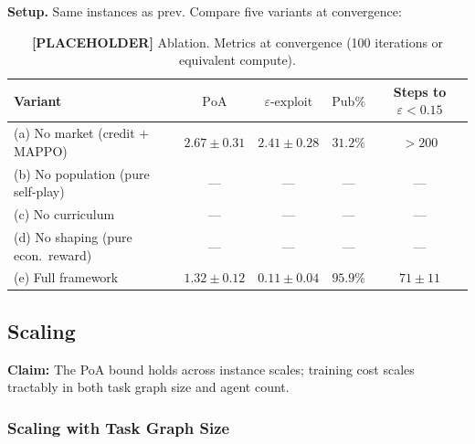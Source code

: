 \textbf{Setup.} Same instances as prev. Compare five variants at convergence:

\begin{table}
\centering
\caption{\textbf{[PLACEHOLDER]} Ablation. Metrics at convergence (100 iterations or equivalent compute).}
\label{tab:e4}
\begin{tabular}{l|cccc}
\toprule
\textbf{Variant} & $\mathrm{PoA}$ & $\varepsilon\text{-exploit}$ & $\mathrm{Pub\%}$ & Steps to $\varepsilon{<}0.15$ \\
\midrule
(a) No market (credit + MAPPO) & $2.67 \pm 0.31$ & $2.41 \pm 0.28$ & $31.2\%$ & $> 200$ \\
(b) No population (pure self-play) & --- & --- & --- & --- \\
(c) No curriculum & --- & --- & --- & --- \\
(d) No shaping (pure econ.\ reward) & --- & --- & --- & --- \\
(e) Full framework             & $1.32 \pm 0.12$ & $0.11 \pm 0.04$ & $95.9\%$ & $71 \pm 11$  \\
\bottomrule
\end{tabular}
\end{table}



\subsection{Scaling}\label{sec:exp-scale}

\textbf{Claim:} The PoA bound holds across instance scales; training cost scales tractably in both task graph size and agent count.
 
\subsubsection{Scaling with Task Graph Size}
 
